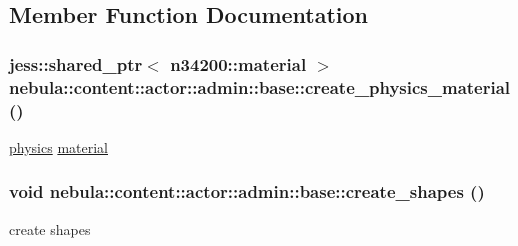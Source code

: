 \subsection{Member Function Documentation}
\hypertarget{classnebula_1_1content_1_1actor_1_1admin_1_1base_ac2643e9073e945c500734ae5054b74f1}{
\subsubsection[{create\_\-physics\_\-material}]{\setlength{\rightskip}{0pt plus 5cm}jess::shared\_\-ptr$<$ {\bf n34200::material} $>$ nebula::content::actor::admin::base::create\_\-physics\_\-material ()}}
\label{classnebula_1_1content_1_1actor_1_1admin_1_1base_ac2643e9073e945c500734ae5054b74f1}


\hyperlink{namespacenebula_1_1content_1_1actor_1_1physics}{physics} \hyperlink{classnebula_1_1content_1_1actor_1_1admin_1_1material}{material} \hypertarget{classnebula_1_1content_1_1actor_1_1admin_1_1base_a0b3740d9da779fe2817e0d64ac733cdf}{
\subsubsection[{create\_\-shapes}]{\setlength{\rightskip}{0pt plus 5cm}void nebula::content::actor::admin::base::create\_\-shapes ()}}
\label{classnebula_1_1content_1_1actor_1_1admin_1_1base_a0b3740d9da779fe2817e0d64ac733cdf}


create shapes 

